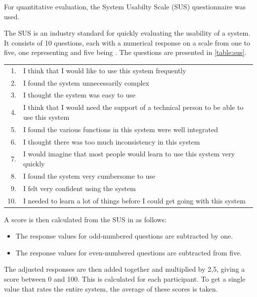 For quantitative evaluation, the System Usabilty Scale (SUS) questionnaire was used.

The SUS is an industry standard for quickly evaluating the usability of a system. It consists of 10 questions, each with a numerical response on a scale from one to five, one representing  and five being . The questions are presented in \autoref{table:sus}. \cite{Sus}

\begin{table}[htb]
\centering
\begin{tabular}{r>{\raggedright\arraybackslash}p{11.5cm}}
\toprule
1. & I think that I would like to use this system frequently \\
2. & I found the system unnecessarily complex \\
3. & I thought the system was easy to use \\
4. & I think that I would need the support of a technical person to be able to use this system \\
5. & I found the various functions in this system were well integrated \\
6. & I thought there was too much inconsistency in this system \\
7. & I would imagine that most people would learn to use this system very quickly \\
8. & I found the system very cumbersome to use \\
9. & I felt very confident using the system \\
10. &  I needed to learn a lot of things before I could get going with this system \\
\bottomrule
\end{tabular}
\label{table:sus}
\end{table}

A score is then calculated from the SUS in as follows:
\begin{itemize}[label=\rectanglebullet]
    \item The response values for odd-numbered questions are subtracted by one.
    \item The response values for even-numbered questions are subtracted from five.
\end{itemize}
The adjusted responses are then added together and multiplied by 2,5, giving a score between 0 and 100. This is calculated for each participant. To get a single value that rates the entire system, the average of these scores is taken. \cite{Sauro2011}


